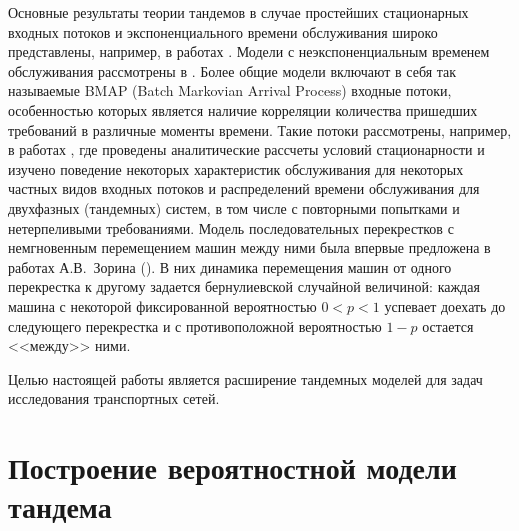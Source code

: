 \documentclass[a4paper,12pt,russian]{extarticle}
\begin{document}
Основные результаты теории тандемов в случае простейших стационарных входных потоков и экспоненциального времени обслуживания широко представлены, например, в работах \cite{Balsamo:2003, Gnedenko:Konig:1983, Perros:1994, Perros:1989}. Модели с неэкспоненциальным временем обслуживания рассмотрены в \cite{Gomez:2002:1, Gomez:2002:2, Gomez:2002:3}. Более общие модели включают в себя так называемые BMAP (Batch Markovian Arrival Process) входные потоки, особенностью которых является наличие корреляции количества пришедших требований в различные моменты времени. Такие потоки рассмотрены, например, в работах \cite{Klimenok:Dudin:2005,Klimenok:Dudin:2004, Klimenok:2010, Klimenok:2011, Klimenok:2015}, где проведены аналитические рассчеты условий стационарности и изучено поведение некоторых характеристик обслуживания для некоторых частных видов входных потоков и распределений времени обслуживания для двухфазных (тандемных) систем, в том числе с повторными попытками и нетерпеливыми требованиями. 
Модель последовательных перекрестков с немгновенным перемещением машин между ними была впервые предложена в работах А.В.~Зорина (\cite{Zorine:2010, Zorine:2011:2, Zorine:2012}). В них динамика перемещения машин от одного перекрестка к другому задается бернулиевской случайной величиной: каждая машина с некоторой фиксированной вероятностью $0<p<1$ успевает доехать до следующего перекрестка и с противоположной вероятностью $1-p$ остается <<между>> ними.

Целью настоящей работы является расширение тандемных моделей для задач исследования транспортных сетей. 


\section{Построение вероятностной модели тандема}
\end{document}
